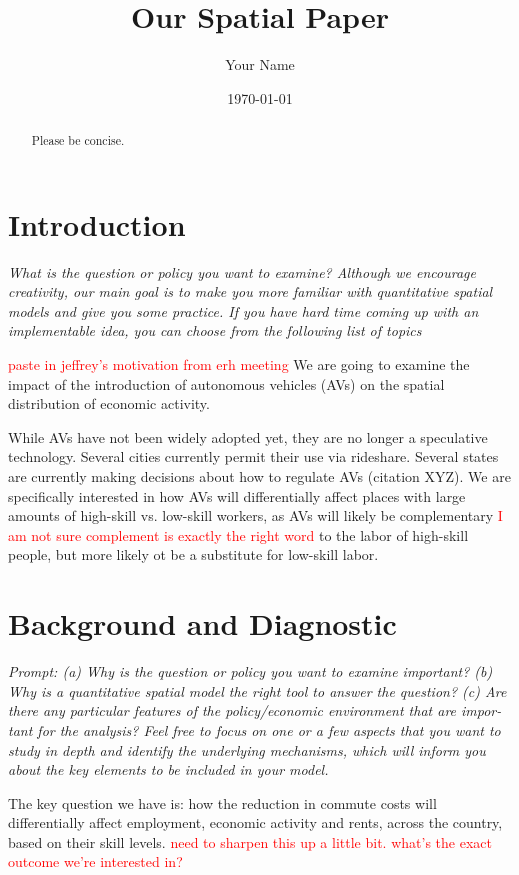 \documentclass{article}
\title{Our Spatial Paper}
\author{Your Name}
\date{\today}
\begin{document}
\maketitle

\begin{abstract}
    Please be concise.
\end{abstract}





\section{Introduction}
\textit{What is the question or policy you want to examine? Although we encourage
creativity, our main goal is to make you more familiar with quantitative spatial models
and give you some practice. If you have hard time coming up with an implementable
idea, you can choose from the following list of topics}


\textcolor{red}{paste in jeffrey's motivation from erh meeting}
We are going to examine the impact of the introduction of autonomous vehicles (AVs) on the spatial distribution of economic activity. 

While AVs have not been widely adopted yet, they are no longer a speculative technology. Several cities currently permit their use via rideshare. 
Several states are currently making decisions about how to regulate AVs (citation XYZ).
We are specifically interested in how AVs will differentially affect places with large amounts of high-skill vs. low-skill workers, as AVs will likely be complementary \textcolor{red}{I am not sure complement is exactly the right word} to the labor of high-skill people,
but more likely ot be a substitute for low-skill labor. 



\section{Background and Diagnostic}
\textit{Prompt: (a) Why is the question or policy you want to examine
important? (b) Why is a quantitative spatial model the right tool to answer the question? (c) Are there any particular features of the policy/economic environment that are impor-
tant for the analysis? Feel free to focus on one or a few aspects that you want to study
in depth and identify the underlying mechanisms, which will inform you about the key
elements to be included in your model.}

The key question we have is: how the reduction in commute costs will differentially affect employment, economic activity and rents, across the country, based on their skill levels. \textcolor{red}{need to sharpen this up a little bit. what's the exact outcome we're interested in? }
\end{document}
